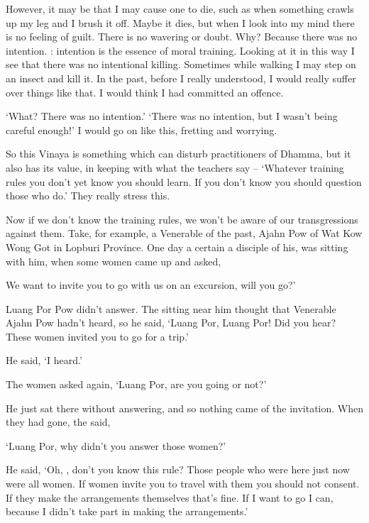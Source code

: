 However, it may be that I may cause one to die, such as when something crawls up my leg and I brush it off. Maybe it dies, but when I look into my mind there is no feeling of guilt. There is no wavering or doubt. Why? Because there was no intention. : intention is the essence of moral training. Looking at it in this way I see that there was no intentional killing. Sometimes while walking I may step on an insect and kill it. In the past, before I really understood, I would really suffer over things like that. I would think I had committed an offence. 

`What? There was no intention.' `There was no intention, but I wasn't being careful enough!' I would go on like this, fretting and worrying. 

So this Vinaya is something which can disturb practitioners of Dhamma, but it also has its value, in keeping with what the teachers say -- `Whatever training rules you don't yet know you should learn. If you don't know you should question those who do.' They really stress this. 

Now if we don't know the training rules, we won't be aware of our transgressions against them. Take, for example, a Venerable  of the past, Ajahn Pow of Wat Kow Wong Got in Lopburi Province. One day a certain  a disciple of his, was sitting with him, when some women came up and asked, 

 We want to invite you to go with us on an excursion, will you go?' 

Luang Por Pow didn't answer. The  sitting near him thought that Venerable Ajahn Pow hadn't heard, so he said, `Luang Por, Luang Por! Did you hear? These women invited you to go for a trip.' 

He said, `I heard.' 

The women asked again, `Luang Por, are you going or not?' 

He just sat there without answering, and so nothing came of the invitation. When they had gone, the  said, 

`Luang Por, why didn't you answer those women?' 

He said, `Oh, , don't you know this rule? Those people who were here just now were all women. If women invite you to travel with them you should not consent. If they make the arrangements themselves that's fine. If I want to go I can, because I didn't take part in making the arrangements.' 

